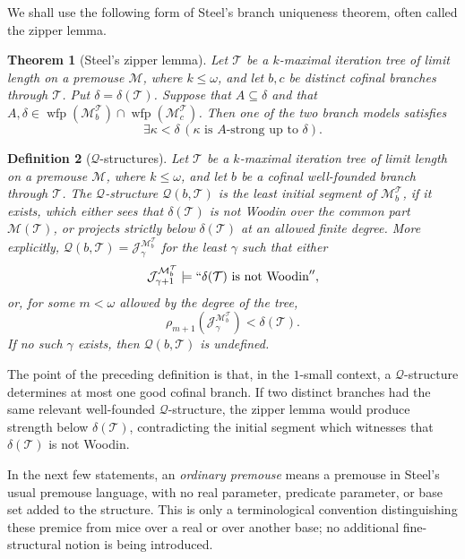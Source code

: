 \documentclass[a4paper,11pt]{article}
\newtheorem{theorem}{Theorem}[section]
\newtheorem{definition}[theorem]{Definition}
\begin{document}
We shall use the following form of Steel's branch uniqueness theorem, often called the zipper lemma.

\begin{theorem}[Steel's zipper lemma]\label{thm:zipper-local}
Let $\mathcal T$ be a $k$-maximal iteration tree of limit length on a premouse $\mathcal M$, where $k\leq\omega$, and let $b,c$ be distinct cofinal branches through $\mathcal T$.  Put $\delta=\delta(\mathcal T)$.  Suppose that $A\subseteq\delta$ and that $A,\delta\in\operatorname{wfp}(\mathcal M_b^{\mathcal T})\cap\operatorname{wfp}(\mathcal M_c^{\mathcal T})$.  Then one of the two branch models satisfies
\[
   \exists\kappa<\delta\,
   (\kappa\text{ is }A\text{-strong up to }\delta).
\]
\end{theorem}

\begin{definition}[$\mathcal Q$-structures]\label{def:q-structures-local}
Let $\mathcal T$ be a $k$-maximal iteration tree of limit length on a premouse $\mathcal M$, where $k\leq\omega$, and let $b$ be a cofinal well-founded branch through $\mathcal T$.  The $\mathcal Q$-structure $\mathcal Q(b,\mathcal T)$ is the least initial segment of $\mathcal M_b^{\mathcal T}$, if it exists, which either sees that $\delta(\mathcal T)$ is not Woodin over the common part $\mathcal M(\mathcal T)$, or projects strictly below $\delta(\mathcal T)$ at an allowed finite degree.  More explicitly, $\mathcal Q(b,\mathcal T)=\mathcal J_\gamma^{\mathcal M_b^{\mathcal T}}$ for the least $\gamma$ such that either
\[
   \mathcal J_{\gamma+1}^{\mathcal M_b^{\mathcal T}}
      \models ``\delta(\mathcal T)\text{ is not Woodin}'',
\]
or, for some $m<\omega$ allowed by the degree of the tree,
\[
   \rho_{m+1}(\mathcal J_\gamma^{\mathcal M_b^{\mathcal T}})
      <\delta(\mathcal T).
\]
If no such $\gamma$ exists, then $\mathcal Q(b,\mathcal T)$ is undefined.
\end{definition}

The point of the preceding definition is that, in the $1$-small context, a $\mathcal Q$-structure determines at most one good cofinal branch.  If two distinct branches had the same relevant well-founded $\mathcal Q$-structure, the zipper lemma would produce strength below $\delta(\mathcal T)$, contradicting the initial segment which witnesses that $\delta(\mathcal T)$ is not Woodin.

In the next few statements, an \emph{ordinary premouse} means a premouse in Steel's usual premouse language, with no real parameter, predicate parameter, or base set added to the structure.  This is only a terminological convention distinguishing these premice from mice over a real or over another base; no additional fine-structural notion is being introduced.
\end{document}
